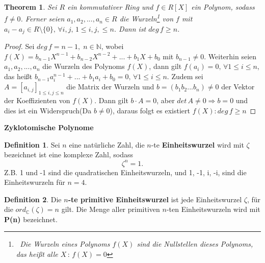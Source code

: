 \documentclass[12pt,oneside]{article}
\newtheorem{theorem}{Theorem}[section]
\theoremstyle{remark}
\theoremstyle{definition}
\newtheorem{definition}{Definition}[section]
\begin{document}
\smallskip

\begin{theorem}\label{number_of_roots}
Sei $R$ ein kommutativer Ring und $f \in R[X]$ ein Polynom, sodass $f \neq 0$. Ferner seien $a_1, a_2,...,a_n \in R$ die Wurzeln\footnote{$\,$ Die Wurzeln eines Polynoms $f(X)$ sind die Nullstellen dieses Polynoms, das heißt alle $X \, : \, f(X) = 0$ } von $f$ mit $a_i - a_j \in R\setminus\{0\} , \, \forall i,j, \, 1 \leq i,j, \leq n$. Dann ist $deg \, f \geq n$.
\end{theorem}

\begin{proof}
Sei $deg \, f = n - 1, \; n \in \mathbb{N}$, wobei $f(X) = b_{n-1}X^{n-1} + b_{n-2}X^{n-2} + ... + b_1 X + b_0$ mit $b_{n-1} \neq 0$. Weiterhin seien $a_1,a_2,...,a_{n}$ die Wurzeln des Polynoms $f(X)$, dann gilt $f(a_i) = 0, \, \forall 1 \leq i \leq n$, das heißt $b_{n-1} a_i^{n-1} +...+ b_1 a_i + b_0 = 0, \, \forall 1 \leq i \leq n$. \newline\newline Zudem sei $A = [a_{i,j}]_{1 \leq i,j \leq n}$ die Matrix der Wurzeln und $b = (b_1 b_2 ...b_{n}) \neq 0$ der Vektor der Koeffizienten von $f(X)$. Dann gilt $b \cdot A = 0$, aber $det \, A \neq 0 \Rightarrow  b = 0$ und dies ist ein Widerspruch(Da $b \neq 0$), daraus folgt es existiert $f(X) : deg \, f \geq n$  
\end{proof}

\smallskip

\textbf{Zyklotomische Polynome}

\begin{definition}
Sei $n$ eine natürliche Zahl, die $n$-te \textbf{Einheitswurzel} wird mit $\zeta$ bezeichnet ist eine komplexe Zahl, sodass
\begin{equation}
    \zeta^n = 1.
\end{equation}
Z.B. 1 und -1 sind die quadratischen Einheitswurzeln, und 1, -1, i, -i, sind die Einheitswurzeln für $n = 4$.    
\end{definition}

\smallskip

\begin{definition}\label{prim_ein}
Die \textbf{$n$-te primitive Einheitswurzel} ist jede Einheitswurzel $\zeta$, für die $ord_{\mathbb{C}}(\zeta) = n $ gilt. Die Menge aller primitiven $n$-ten Einheitswurzeln wird mit \textbf{P(n)} bezeichnet. 
\end{definition}

\smallskip
\end{document}
